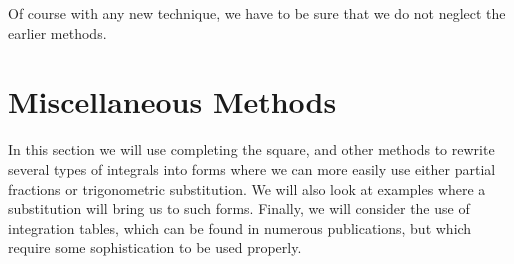 Of course with any new technique, we have to be sure that
we do not neglect the earlier methods.


\section{Miscellaneous Methods}

In this section we will use completing the square, and other
methods to rewrite several types of integrals into forms
where we can more easily use either partial fractions
or trigonometric substitution.  We will also look at examples
where a substitution will bring us to such forms.  Finally, we
will consider the use of integration tables, which 
can be found in numerous publications, but which require
some sophistication to be used properly.







\newpage


